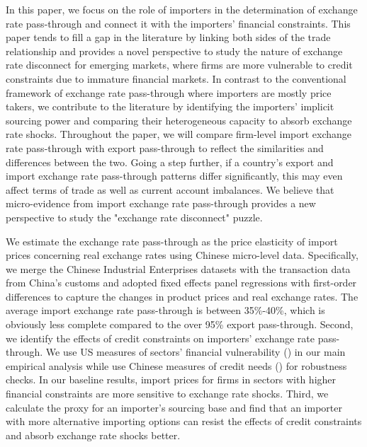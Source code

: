 \documentclass[12pt]{article}
\begin{document}
In this paper, we focus on the role of importers in the determination of exchange rate pass-through and connect it with the importers' financial constraints. This paper tends to fill a gap in the literature by linking both sides of the trade relationship and provides a novel perspective to study the nature of exchange rate disconnect for emerging markets, where firms are more vulnerable to credit constraints due to immature financial markets. In contrast to the conventional framework of exchange rate pass-through where importers are mostly price takers, we contribute to the literature by identifying the importers' implicit sourcing power and comparing their heterogeneous capacity to absorb exchange rate shocks. Throughout the paper, we will compare firm-level import exchange rate pass-through with export pass-through to reflect the similarities and differences between the two. Going a step further, if a country's export and import exchange rate pass-through patterns differ significantly, this may even affect terms of trade as well as current account imbalances. We believe that micro-evidence from import exchange rate pass-through provides a new perspective to study the "exchange rate disconnect" puzzle.

We estimate the exchange rate pass-through as the price elasticity of import prices concerning real exchange rates using Chinese micro-level data. Specifically, we merge the Chinese Industrial Enterprises datasets with the transaction data from China’s customs and adopted fixed effects panel regressions with first-order differences to capture the changes in product prices and real exchange rates. The average import exchange rate pass-through is between 35\%-40\%, which is obviously less complete compared to the over 95\% export pass-through. Second, we identify the effects of credit constraints on importers' exchange rate pass-through. We use US measures of sectors’ financial vulnerability (\cite{manova-wei-zhang2015}) in our main empirical analysis while use Chinese measures of credit needs (\cite{fan-li-yeaple2015}) for robustness checks. In our baseline results, import prices for firms in sectors with higher financial constraints are more sensitive to exchange rate shocks. Third, we calculate the proxy for an importer's sourcing base and find that an importer with more alternative importing options can resist the effects of credit constraints and absorb exchange rate shocks better.
\end{document}
